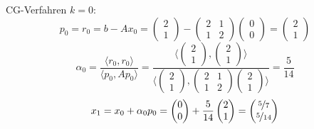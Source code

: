 \begin{example}{CG-Verfahren}
    $k = 0$:
    \[
        p_0 = r_0 = b - Ax_0 =
        \begin{pmatrix}
            2 \\ 1
        \end{pmatrix}
        -
        \begin{pmatrix}
            2 & 1 \\
            1 & 2
        \end{pmatrix}
        \begin{pmatrix}
            0 \\ 0
        \end{pmatrix}
        =
        \begin{pmatrix}
            2 \\ 1
        \end{pmatrix}
    \]
    \[
        \alpha_0 = \frac{\langle r_0, r_0 \rangle}{\langle p_0, A p_0 \rangle}
        =
        \frac{\langle
            \begin{pmatrix}
                2 \\ 1
            \end{pmatrix},
            \begin{pmatrix}
                2 \\ 1
            \end{pmatrix}
            \rangle}{\langle
            \begin{pmatrix}
                2 \\ 1
            \end{pmatrix},
            \begin{pmatrix}
                2 & 1 \\
                1 & 2
            \end{pmatrix}
            \begin{pmatrix}
                2 \\ 1
            \end{pmatrix}
            \rangle}
        = \frac{5}{14}
    \]
    \[
        x_{1} = x_0 + \alpha_0 p_0 =
        \begin{pmatrix}
            0 \\ 0
        \end{pmatrix}
        + \frac{5}{14}
        \begin{pmatrix}
            2 \\ 1
        \end{pmatrix}
        =
        \begin{pmatrix}
            \nicefrac{5}{7} \\ \nicefrac{5}{14}

\end{pmatrix}\]
\end{example}

